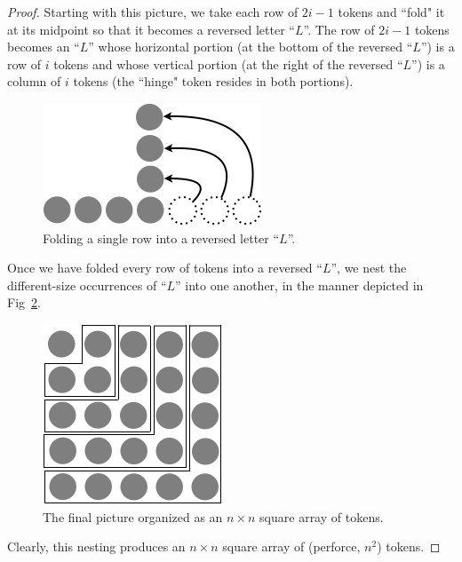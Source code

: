 \begin{proof}
Starting with this picture, we take each row of $2i-1$ tokens and ``fold" it at its midpoint so that it becomes a reversed letter ``$L$''.  The row of $2i-1$ tokens becomes an ``$L$'' whose horizontal portion (at the bottom of the reversed ``$L$'') is a row of $i$ tokens and whose vertical portion (at the right of the reversed ``$L$'') is a column of $i$ tokens (the ``hinge" token resides in both portions).
\begin{figure}[ht]
\begin{center}
       \includegraphics[scale=0.4]{FiguresMaths/SumOddsIntermediate}
              \caption{Folding a single row into a reversed letter ``$L$''.}
       \label{fig:sumOdds2}
\end{center}
\end{figure}

Once we have folded every row of tokens into a reversed ``$L$'', we nest the different-size occurrences of ``$L$'' into one another, in the manner depicted in Fig~\ref{fig:sumOdds3}.
\begin{figure}[ht]
\begin{center}
       \includegraphics[scale=0.4]{FiguresMaths/SumOddsFinal}
\caption{The final picture organized as an $n \times n$ square array of tokens.}
       \label{fig:sumOdds3}
\end{center}
\end{figure}
Clearly, this nesting produces an $n \times n$ square array of (perforce, $n^2$) tokens.
\end{proof}

\medskip

